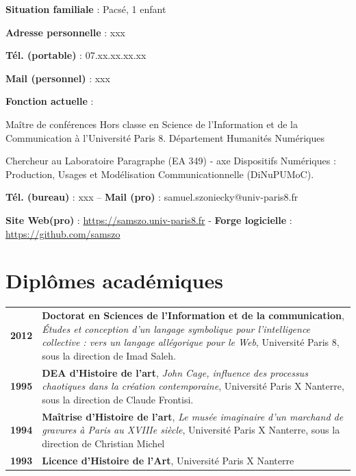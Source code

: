\documentclass[
  a4paper,
  DIV=11,
  numbers=noendperiod]{scrreprt}
\begin{document}
\textbf{Situation familiale} : Pacsé, 1 enfant

\textbf{Adresse personnelle} : xxx

\textbf{Tél. (portable)} : 07.xx.xx.xx.xx

\textbf{Mail (personnel)} : xxx

\textbf{Fonction actuelle} :

Maître de conférences Hors classe en Science de l'Information et de la
Communication à l'Université Paris 8. Département Humanités Numériques

Chercheur au Laboratoire Paragraphe (EA 349) - axe Dispositifs
Numériques : Production, Usages et Modélisation Communicationnelle
(DiNuPUMoC).

\textbf{Tél. (bureau)} : xxx -- \textbf{Mail (pro)} :
samuel.szoniecky@univ-paris8.fr

\textbf{Site Web(pro)} :
\href{https://samszo.univ-paris8.fr/}{https://samszo.univ-paris8.fr} -
\textbf{Forge logicielle} : \url{https://github.com/samszo}

\section{Diplômes académiques}\label{dipluxf4mes-acaduxe9miques}

\begin{longtable}[]{@{}
  >{\raggedright\arraybackslash}p{}
  >{\raggedright\arraybackslash}p{}@{}}
\toprule\noalign{}
\endhead
\bottomrule\noalign{}
\endlastfoot
\textbf{2012} & \textbf{Doctorat en Sciences de l'Information et de la
communication}, \emph{Études et conception d'un langage symbolique pour
l'intelligence collective : vers un langage allégorique pour le Web},
Université Paris 8, sous la direction de Imad Saleh. \\
\textbf{1995} & \textbf{DEA d'Histoire de l'art}, \emph{John Cage,
influence des processus chaotiques dans la création contemporaine},
Université Paris X Nanterre, sous la direction de Claude Frontisi. \\
\textbf{1994} & \textbf{Maîtrise d'Histoire de l'art}, \emph{Le musée
imaginaire d'un marchand de gravures à Paris au XVIIIe siècle},
Université Paris X Nanterre, sous la direction de Christian Michel \\
\textbf{1993} & \textbf{Licence d'Histoire de l'Art}, Université Paris X
Nanterre \\
\end{longtable}
\end{document}
